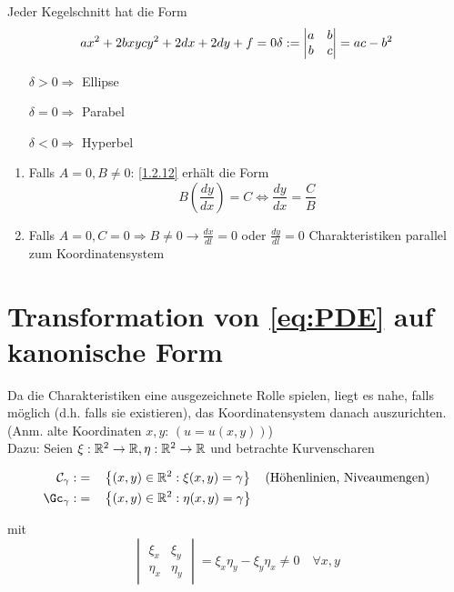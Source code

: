 Jeder Kegelschnitt hat die Form 
\[
    ax^2 + 2bxy cy^2 + 2dx + 2dy + f = 0\\
    \delta:= \begin{vmatrix} a & b\\ b & c\end{vmatrix} = ac - b^2\\
\]
\begin{itemize}
    \item[$\delta>0 \Rightarrow$] Ellipse
    \item[$\delta=0 \Rightarrow$] Parabel
    \item[$\delta<0 \Rightarrow$] Hyperbel
\end{itemize}

\begin{bemerkung} %
    \begin{enumerate}
        \item Falls $A=0, B\neq 0$: \eqref{1.2.12} erhält die Form 
            \[
                B\left( \frac{dy}{dx} \right) = C \Leftrightarrow \frac{dy}{dx} = \frac{C}{B} 
            \]
        \item Falls $A=0, C=0 \Rightarrow B\neq 0 \rightarrow \frac{dx}{dl}=0$ oder $\frac{dy}{dl}=0$ Charakteristiken parallel zum Koordinatensystem
    \end{enumerate}
\end{bemerkung}

\section*{Transformation von \eqref{eq:PDE} auf kanonische Form}

Da die Charakteristiken eine ausgezeichnete Rolle spielen, liegt es nahe, falls möglich (d.h. falls sie existieren), das Koordinatensystem danach auszurichten. (Anm. alte Koordinaten $x,y$: $(u=u(x,y))$)\\
Dazu: Seien $\xi: \mathbb{R}^2\to\mathbb{R}, \eta: \mathbb{R}^2\to\mathbb{R}$ und betrachte Kurvenscharen

\begin{align*}
    \Cc_\gamma :&=&  &\left\{ (x,y)\in\R^2: \xi(x,y)=\gamma \right\} \quad \text{(Höhenlinien, Niveaumengen)}\\
    \Gc_\gamma :&=&  &\left\{ (x,y)\in\R^2: \eta(x,y)=\gamma \right\} 
\end{align*}

mit 
\begin{equation} %
    \begin{vmatrix}
        \xi_x & \xi_y\\
        \eta_x & \eta_y
    \end{vmatrix}
    = 
    \xi_x\eta_y - \xi_y\eta_x \neq 0 \quad \forall x,y
    \label{}
\end{equation}

